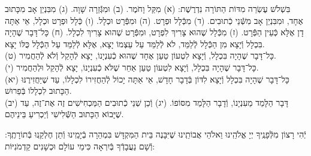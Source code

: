 \documentclass[twoside, openany, parskip=half, 11pt]{book}
\begin{document}
בִּשְׁלֹשׁ עֶשְׂרֵה מִדּוֹת הַתּוֹרָה נִדְרֶשֶׁת:\hfill \break
(א) מִקַּל וָחֹמֶר.\hfill \break
(ב) וּמִגְּֿֿזֵרָה שָׁוָה.\hfill \break
(ג) מִבִּנְיַן אָב מִכָּתוּב אֶחָד, וּמִבִּנְיַן אָב מִשְּֿֿׁנֵי כְֿתוּבִים.\hfill \break
(ד) מִכְּֿֿלָל וּפְרָט.\hfill \break
(ה) וּמִפְּֿֿרָט וּכְלָל.\hfill \break
(ו) כְּֿלָל וּפְרָט וּכְלָל, אֵי אַתָּה דָן אֶלָּא כְּֿעֵין הַפְּֿֿרָט.\hfill \break
(ז) מִכְּֿֿלָל שֶׁהוּא צָרִיךְ לִפְרָט, וּמִפְּֿֿרָט שֶׁהוּא צָרִיךְ לִכְלָל.\hfill \break
(ח) כָּל־דָּבָר שֶׁהָיָה בִּכְלָל וְֿיָצָא מִן הַכְּֿֿלָל לְֿלַמֵּד, לֹא לְֿלַמֵּד עַל עַצְמוֹ יָצָא, אֶלָּא לְֿלַמֵּד עַל הַכְּֿֿלָל כֻּלּוֹ יָצָא. \\
(ט) כָּל־דָּבָר שֶׁהָיָה בִּכְלָל, וְֿיָצָא לִטְעוֹן טַעַן אֶחָד שֶׁהוּא כְֿעִנְיָנוֹ, יָצָא לְֿהָקֵל וְֿלֹא לְֿהַחֲמִיר. \\
(י) כָּל־דָּבָר שֶׁהָיָה בִּכְלָל, וְֿיָצָא לִטְעוֹן טַעַן אַחֵר שֶׁלֹּא כְֿעִנְיָנוֹ, יָצָא לְֿהָקֵל וּלְהַחֲמִיר. \\
(יא) כָּל־דָּבָר שֶׁהָיָה בִּכְלָל וְֿיָצָא לִדּוֹן בְּֿדָבָר חָדָשׁ, אֵי אַתָּה יָכוֹל לְֿהַחֲזִירוֹ לִכְלָלוֹ, עַד שֶׁיַּחֲזִירֶנּוּ הַכָּתוּב לִכְלָלוֹ בְּֿפֵרוּשׁ. \\
(יב) דָּבָר הַלָּמֵד מֵעִנְיָנוֹ, וְֿדָבָר הַלָּמֵד מִסּוֹפוֹ.\hfill \break
(יג) וְֿכֵן שְׁנֵי כְֿתוּבִים הַמַּכְחִישִׁים זֶה אֶת־זֶה, עַד שֶׁיָּבוֹא הַכָּתוּב הַשְּֿֿׁלִישִׁי וְֿיַכְרִיעַ בֵּינֵיהֶם.

יְֿהִי רָצוֹן מִלְּֿפָנֶֽיךָ יְיָ אֱלֹהֵֽינוּ וֵאלֹהֵי אֲבוֹתֵֽינוּ שֶׁיִּבָּנֶה בֵּית הַמִּקְדָּשׁ בִּמְהֵרָה בְֿיָמֵֽינוּ וְֿתֵן חֶלְקֵֽנוּ בְּֿתוֹרָתֶֽךָ: וְֿשָׁם נַעֲבָדְֿךָ בְּֿיִרְאָה כִּימֵי עוֹלָם וּכְשָׁנִים קַדְמֹנִיּוֹת:




\vfill
\rabbiskaddish
\end{document}
